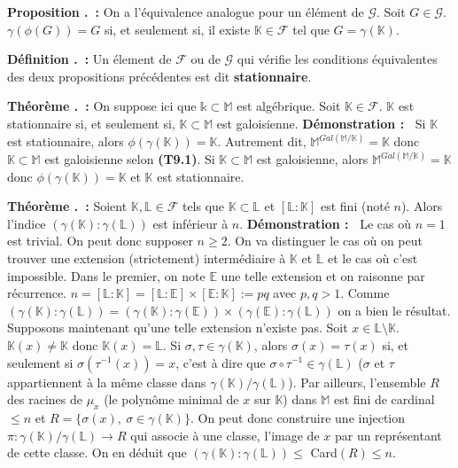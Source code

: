 \documentclass[5pt,a4paper]{article}
\newcounter{prop}[section]
\newcounter{defin}[section]
\newcounter{thm}[section]
\renewcommand{\theprop}{\thesection.\arabic{prop}}
\renewcommand{\thedefin}{\thesection.\arabic{defin}}
\renewcommand{\thethm}{\thesection.\arabic{thm}}
\newcommand{\prop}[1]{\stepcounter{prop}\noindent\textbf{Proposition \theprop ~:} #1 \newline}
\newcommand{\defin}[1]{\stepcounter{defin}\noindent\textbf{Définition \thedefin ~:} #1 \newline}
\newcommand{\thm}[1]{\stepcounter{thm}\noindent\textbf{Théorème \thethm ~:} #1 \newline}
\newcommand{\demo}[1]{\textbf{Démonstration :~} #1 \newline}
\begin{document}
\begin{onehalfspacing}
\prop{On a l'équivalence analogue pour un élément de $\mathcal{G}$. Soit $G \in \mathcal{G}$. $\gamma(\phi(G)) = G$ si, et seulement si, il existe $\mathbb{K} \in \mathcal{F}$ tel que $G = \gamma(\mathbb{K})$.}


\defin{Un élement de $\mathcal{F}$ ou de $\mathcal{G}$ qui vérifie les conditions équivalentes des deux propositions précédentes est dit \textbf{stationnaire}.}


\thm{On suppose ici que $\mathds{k} \subset \mathbb{M}$ est algébrique. Soit $\mathbb{K} \in \mathcal{F}$. $\mathbb{K}$ est stationnaire si, et seulement si, $\mathbb{K} \subset \mathbb{M}$ est galoisienne.}
\demo{Si $\mathbb{K}$ est stationnaire, alors $\phi(\gamma(\mathbb{K})) = \mathbb{K}$. Autrement dit, $\mathbb{M}^{Gal(\mathbb{M}/\mathbb{K})} = \mathbb{K}$ donc $\mathbb{K} \subset \mathbb{M}$ est galoisienne selon \textbf{(T9.1)}. Si $\mathbb{K} \subset \mathbb{M}$ est galoisienne, alors $\mathbb{M}^{Gal(\mathbb{M}/\mathbb{K})} = \mathbb{K}$ donc $\phi(\gamma(\mathbb{K})) = \mathbb{K}$ et $\mathbb{K}$ est stationnaire.}


\thm{Soient $\mathbb{K}, \mathbb{L} \in \mathcal{F}$ tels que $\mathbb{K} \subset \mathbb{L}$ et $[\mathbb{L} : \mathbb{K}]$ est fini (noté $n$). Alors l'indice $(\gamma(\mathbb{K}) : \gamma(\mathbb{L}))$ est inférieur à $n$.}
\demo{Le cas où $n = 1$ est trivial. On peut donc supposer $n \geq 2$. On va distinguer le cas où on peut trouver une extension (strictement) intermédiaire à $\mathbb{K}$ et $\mathbb{L}$ et le cas où c'est impossible. Dans le premier, on note $\mathbb{E}$ une telle extension et on raisonne par récurrence. $n = [\mathbb{L} : \mathbb{K}] = [\mathbb{L} : \mathbb{E}]\times[\mathbb{E} : \mathbb{K}] := pq$ avec $p,q > 1$. Comme $(\gamma(\mathbb{K}) : \gamma(\mathbb{L})) = (\gamma(\mathbb{K}) : \gamma(\mathbb{E}))\times(\gamma(\mathbb{E}) : \gamma(\mathbb{L}))$ on a bien le résultat. Supposons maintenant qu'une telle extension n'existe pas. Soit $x \in \mathbb{L} \setminus \mathbb{K}$. $\mathbb{K}(x) \neq \mathbb{K}$ donc $\mathbb{K}(x) = \mathbb{L}$. Si $\sigma, \tau \in \gamma(\mathbb{K})$, alors $\sigma(x) = \tau(x)$ si, et seulement si $\sigma(\tau^{-1}(x)) = x$, c'est à dire que $\sigma \circ \tau^{-1} \in \gamma(\mathbb{L})$ ($\sigma$ et $\tau$ appartiennent à la même classe dans $\gamma(\mathbb{K})/\gamma(\mathbb{L})$). Par ailleurs, l'ensemble $R$ des racines de $\mu_x$ (le polynôme minimal de $x$ sur $\mathbb{K}$) dans $\mathbb{M}$ est fini de cardinal $\leq n$ et $R = \{\sigma(x),~\sigma \in \gamma(\mathbb{K})\}$. On peut donc construire une injection $\pi : \gamma(\mathbb{K})/\gamma(\mathbb{L}) \rightarrow R$ qui associe à une classe, l'image de $x$ par un représentant de cette classe. On en déduit que $(\gamma(\mathbb{K}) : \gamma(\mathbb{L})) \leq$ Card$(R) \leq n$.}



\end{onehalfspacing}
\end{document}
